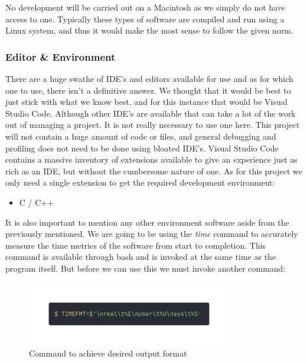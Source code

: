 \documentclass{article}
\begin{document}
No development will be carried out on a Macintosh as we simply do not have access to one. Typically these types of software are 
compiled and run using a Linux system, and thus it would make the most sense to follow the given norm.

\subsubsection{Editor \& Environment}
There are a huge swathe of IDE's and editors available for use and as for which one to use, there isn't a definitive answer. We 
thought that it would be best to just stick with what we know best, and for this instance that would be Visual Studio Code. 
Although other IDE's are available that can take a lot of the work out of managing a project. It is not really necessary to use 
one here. This project will not contain a huge amount of code or files, and general debugging and profiling does not need to be 
done using bloated IDE's. Visual Studio Code contains a massive inventory of extensions available to give an experience just as 
rich as an IDE, but without the cumbersome nature of one. As for this project we only need a single extension to get the required 
development environment:

\begin{itemize}
    \item C / C++
\end{itemize}

It is also important to mention any other environment software aside from the previously mentioned. We are going to be using the 
\textit{time} command to accurately measure the time metrics of the software from start to completion. This command is available 
through bash and is invoked at the same time as the program itself. But before we can use this we must invoke another command:

\begin{figure}[h]
    \centering
    \includegraphics[width=0.8\textwidth]{time_command_format.png}
    \caption{Command to achieve desired output format}
\end{figure}
\end{document}
